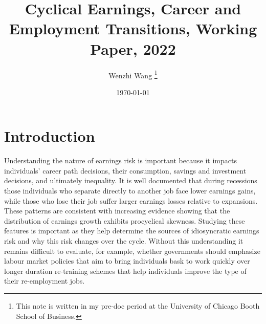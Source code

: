 \documentclass[12pt]{article}
\newcommand{\highlightR}[1]{{\emph{\color{MyRed}{#1}}}}
\newcommand{\highlightP}[1]{{\emph{\color{MyPink}{#1}}}}
\theoremstyle{definition}
\begin{document}
 


\title{\bf Cyclical Earnings, Career and Employment Transitions, Working Paper, 2022} 
\author{Wenzhi Wang \thanks{This note is written in my pre-doc period at the University of Chicago Booth School of Business.} } 
\date{\today} 
\maketitle 

\citet{carrillo-tudelaCyclicalEarningsCareer2022}

\section{Introduction}

Understanding the nature of earnings risk is important because it impacts individuals' career path decisions, their consumption, savings and investment decisions, and ultimately inequality. \highlightR{In this paper we study the joint behaviour of earnings risk and career changes over the business cycle.} It is well documented that during recessions those individuals who separate directly to another job face lower earnings gains, while those who lose their job suffer larger earnings losses relative to expansions. These patterns are consistent with increasing evidence showing that the distribution of earnings growth exhibits procyclical skewness. \highlightP{Less is known, however, about the type of job mobility that drives cyclical earnings risk and whether the latter is mainly caused by cyclical changes in the returns to mobility (i.e., the earnings change conditional on a transition), cyclical changes in the frequency of job loss and job finding and how workers' mobility decisions interact with them both.} Studying these features is important as they help determine the sources of idiosyncratic earnings risk and why this risk changes over the cycle. Without this understanding it remains difficult to evaluate, for example, whether governments should emphasize labour market policies that aim to bring individuals bask to work quickly over longer duration re-training schemes that help individuals improve the type of their re-employment jobs.
\end{document}
